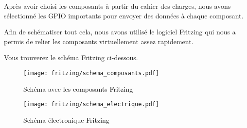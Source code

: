 Après avoir choisi les composants à partir du cahier des charges, nous avons sélectionné les GPIO importants pour envoyer des données à chaque composant.

Afin de schématiser tout cela, nous avons utilisé le logiciel Fritzing qui nous a permis de relier les composants virtuellement assez rapidement.

Vous trouverez le schéma Fritzing ci-dessous.

\bigbreak
\begin{figure}[h]
    \centering
    \texttt{[image: fritzing/schema\_composants.pdf]}
    \caption{Schéma avec les composants Fritzing}
    \label{fig:Schéma des composants Fritzing}
\end{figure}

\begin{figure}[h]
    \centering
    \texttt{[image: fritzing/schema\_electrique.pdf]}
    \caption{Schéma électronique Fritzing}
    \label{fig:Schéma électronique Fritzing}
\end{figure}

\clearpage